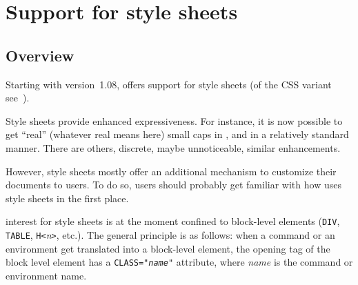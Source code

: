 \section{Support\label{style:sheets} for style sheets}

\subsection{Overview}
Starting with version~1.08, \hevea{} offers support for style sheets
(of the CSS variant see~\cite{css}).

Style sheets provide enhanced expressiveness. For instance, it is now possible
to get ``real'' (whatever real means here) small caps in {\html}, and in a
relatively standard manner. There are others, discrete, maybe
unnoticeable, similar enhancements.

However, style sheets mostly offer an additional mechanism to
customize their documents to \hevea{} users. To do so, users should
probably get familiar with how \hevea{} uses style sheets in the first
place.

\hevea{} interest for style sheets is at the moment confined to
block-level elements (\verb+DIV+, \verb+TABLE+, \verb+H<+\textit{n}\verb+>+,
etc.).
The general principle is as follows: when a command or an
environment get translated into a block-level element,
the opening tag of the block level element has a
\texttt{CLASS="\textit{name}"} attribute, where \textit{name} is the
command or environment name.


